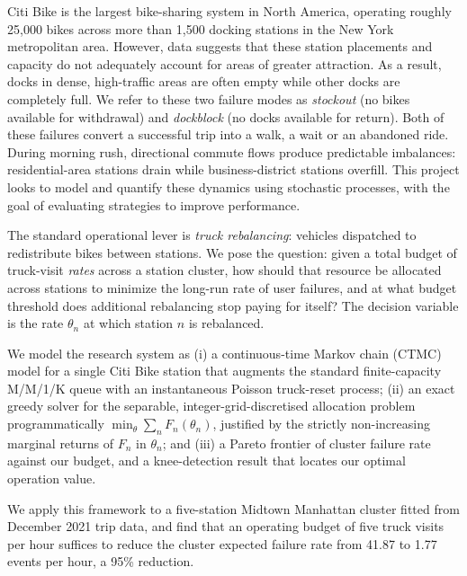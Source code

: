 \documentclass[conference]{IEEEtran}
\begin{document}
Citi Bike is the largest bike-sharing system in North America, operating roughly 25{,}000 bikes across more than 1{,}500 docking stations in the New York metropolitan area. However, data suggests that these station placements and capacity do not adequately account for areas of greater attraction. As a result, docks in dense, high-traffic areas are often empty while other docks are completely full. We refer to these two failure modes as \emph{stockout} (no bikes available for withdrawal) and \emph{dockblock} (no docks available for return). Both of these failures convert a successful trip into a walk, a wait or an abandoned ride. During morning rush, directional commute flows produce predictable imbalances: residential-area stations drain while business-district stations overfill. This project looks to model and quantify these dynamics using stochastic processes, with the goal of evaluating strategies to improve performance.

 The standard operational lever is \emph{truck rebalancing}: vehicles dispatched to redistribute bikes between stations. We pose the question: given a total budget of truck-visit \emph{rates} across a station cluster, how should that resource be allocated across stations to minimize the long-run rate of user failures, and at what budget threshold does additional rebalancing stop paying for itself? The decision variable is the rate $\theta_n$ at which station $n$ is rebalanced.

We model the research system as (i) a continuous-time Markov chain (CTMC) model for a single Citi Bike station that augments the standard finite-capacity M/M/1/K queue with an instantaneous Poisson truck-reset process; (ii) an exact greedy solver for the separable, integer-grid-discretised allocation problem programmatically $\min_{\theta} \sum_n F_n(\theta_n)$, justified by the strictly non-increasing marginal returns of $F_n$ in $\theta_n$; and (iii) a Pareto frontier of cluster failure rate against our budget, and a knee-detection result that locates our optimal operation value.

We apply this framework to a five-station Midtown Manhattan cluster fitted from December 2021 trip data, and find that an operating budget of five truck visits per hour suffices to reduce the cluster expected failure rate from 41.87 to 1.77 events per hour, a 95\% reduction.
\end{document}

